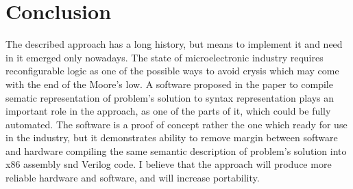 \section{Conclusion}
The described approach has a long history, but means to implement it and need in it emerged only nowadays. The state of microelectronic industry requires reconfigurable logic as one of the possible ways to avoid crysis which may come with the end of the Moore's low. A software proposed in the paper to compile sematic representation of problem's solution to syntax representation plays an important role in the approach, as one of the parts of it, which could be fully automated. The software is a proof of concept rather the one which ready for use in the industry, but it demonstrates ability to remove margin between software and hardware compiling the same semantic description of problem's solution into x86 assembly snd Verilog code. I believe that the approach will produce more reliable hardware and software, and will increase portability.
